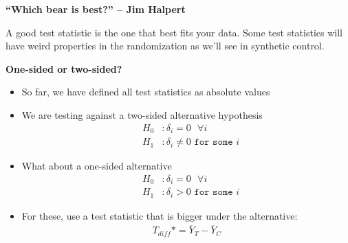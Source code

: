 \documentclass[notes=show]{beamer}
\begin{document}
\begin{frame}[plain]
\begin{center}
\textbf{``Which bear is best?'' -- Jim Halpert}
\end{center}

A good test statistic is the one that best fits your data.  Some test statistics will have weird properties in the randomization as we'll see in synthetic control.

\end{frame}






\clearpage

\begin{frame}[plain]
\begin{center}
\textbf{One-sided or two-sided?}
\end{center}

\begin{itemize}
\item So far, we have defined all test statistics as absolute values
\item We are testing against a two-sided alternative hypothesis
\begin{eqnarray*}
&H_0&: \delta_i = 0 \texttt{ } \forall i \\
&H_1&: \delta_i \neq 0 \texttt{ for some } i
\end{eqnarray*}
\item What about a one-sided alternative
\begin{eqnarray*}
&H_0&: \delta_i = 0\texttt{ } \forall i \\
&H_1&: \delta_i > 0 \texttt{ for some } i
\end{eqnarray*}
\item For these, use a test statistic that is bigger under the alternative:
\begin{eqnarray*}
T_{diff}* = \overline{Y}_T - \overline{Y}_C
\end{eqnarray*}
\end{itemize}

\end{frame}
\end{document}

